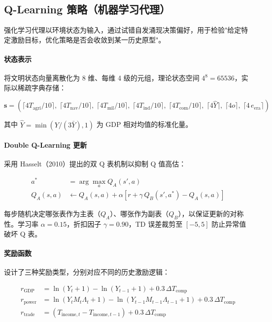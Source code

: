 \documentclass[12pt, a4paper]{article}
\begin{document}
\subsection{Q-Learning 策略（机器学习代理）}

强化学习代理以环境状态为输入，通过试错自发涌现决策偏好，用于检验"给定特定激励目标，优化策略是否会收敛到某一历史原型"。

\paragraph{状态表示}将文明状态向量离散化为 8 维、每维 4 级的元组，理论状态空间 $4^8 = 65536$，实际以稀疏字典存储：

\begin{equation}
\mathbf{s} = \left(\lceil 4 T_{\text{agri}}/10 \rceil,\; \lceil 4 T_{\text{nav}}/10 \rceil,\; \lceil 4 T_{\text{mil}}/10 \rceil,\; \lceil 4 T_{\text{ind}}/10 \rceil,\; \lceil 4 T_{\text{com}}/10 \rceil,\; \lceil 4\hat{Y} \rceil,\; \lceil 4 o \rceil,\; \lceil 4\,e_{\text{era}} \rceil \right)
\label{eq:state}
\end{equation}

其中 $\hat{Y} = \min(Y / (3\bar{Y}), 1)$ 为 GDP 相对均值的标准化量。

\paragraph{Double Q-Learning 更新}采用 Hasselt（2010）提出的双 Q 表机制以抑制 Q 值高估：

\begin{align}
a^* &= \arg\max_a Q_A(s', a) \label{eq:double_q_select} \\
Q_A(s, a) &\leftarrow Q_A(s, a) + \alpha \left[r + \gamma\, Q_B(s', a^*) - Q_A(s, a)\right] \label{eq:double_q_update}
\end{align}

每步随机决定哪张表作为主表（$Q_A$）、哪张作为副表（$Q_B$），以保证更新的对称性。学习率 $\alpha = 0.15$，折扣因子 $\gamma = 0.90$，TD 误差裁剪至 $[-5, 5]$ 防止异常值破坏 Q 表。

\paragraph{奖励函数}设计了三种奖励类型，分别对应不同的历史激励逻辑：

\begin{align}
r_{\text{GDP}}   &= \ln(Y_t + 1) - \ln(Y_{t-1} + 1) + 0.3\,\Delta T_{\text{comp}} \label{eq:reward_gdp} \\
r_{\text{power}} &= \ln(Y_t M_t \Lambda_t + 1) - \ln(Y_{t-1} M_{t-1} \Lambda_{t-1} + 1) + 0.3\,\Delta T_{\text{comp}} \label{eq:reward_power} \\
r_{\text{trade}} &= (T_{\text{income},t} - T_{\text{income},t-1}) + 0.3\,\Delta T_{\text{comp}} \label{eq:reward_trade}
\end{align}
\end{document}
